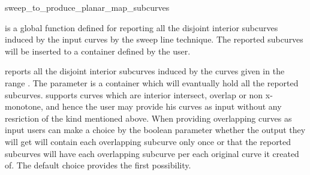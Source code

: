 
\ccRefPageBegin


\begin{ccRefFunction}{sweep_to_produce_planar_map_subcurves}


\ccDefinition
{} is a global function defined for reporting 
all the disjoint interior subcurves induced by the input curves by the sweep line technique.
The reported subcurves will be inserted to a container defined by the user.  


\def\ccLongParamLayout{\ccTrue} 


reports all the disjoint interior subcurves induced by the curves given in the range 
\ccStyle{[curves_begin, curves_end)}. 
The parameter  is a container which will evantually hold all the reported subcurves.
 supports curves which are interior intersect, overlap or non x-monotone, and hence the user may provide his curves as input without any resriction of the kind mentioned above. 
When providing overlapping curves as input users can make a choice by the 
boolean parameter  whether the output they will get will contain each 
overlapping subcurve only once or that the reported subcurves will have each 
overlapping subcurve per each original curve it created of. 
The default choice provides the first possibility.

\ccSeeAlso
{}


\end{ccRefFunction}
